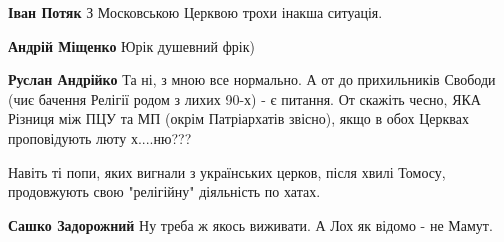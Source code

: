\begin{itemize}
\begin{itemize}
 
\textbf{Іван Потяк} З Московською Церквою трохи інакша ситуація.

 
\textbf{Андрій Міщенко} Юрік душевний фрік)

 
\textbf{Руслан Андрійко} Та ні, з мною все нормально. А от до прихильників
Свободи (чиє бачення Релігії родом з лихих 90-х) - є питання. От скажіть чесно,
ЯКА Різниця між ПЦУ та МП (окрім Патріархатів звісно), якщо в обох Церквах
проповідують люту х....ню???

\end{itemize}

 
Навіть ті попи, яких вигнали з українських церков, після хвилі Томосу,
продовжують свою "релігійну" діяльність по хатах.

\begin{itemize}
 
\textbf{Сашко Задорожний} Ну треба ж якось виживати. А Лох як відомо - не Мамут.
\end{itemize}

 


\end{itemize}
